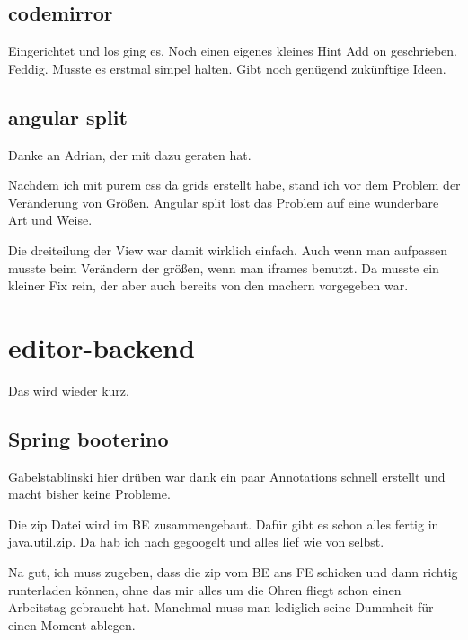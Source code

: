 \subsection{codemirror}\label{subsec:codemirror}
\todo
Eingerichtet und los ging es.
Noch einen eigenes kleines Hint Add on geschrieben.
Feddig.
Musste es erstmal simpel halten.
Gibt noch genügend zukünftige Ideen.

\subsection{angular split}\label{subsec:angular-split}
\todo
Danke an Adrian, der mit dazu geraten hat.

Nachdem ich mit purem css da grids erstellt habe, stand ich vor dem Problem der Veränderung von Größen.
Angular split löst das Problem auf eine wunderbare Art und Weise.

Die dreiteilung der View war damit wirklich einfach.
Auch wenn man aufpassen musste beim Verändern der größen, wenn man iframes benutzt.
Da musste ein kleiner Fix rein, der aber auch bereits von den machern vorgegeben war.

\section{editor-backend}\label{sec:editor-backend}
\todo
Das wird wieder kurz.

\subsection{Spring booterino}\label{subsec:spring-booterino}
\todo
Gabelstablinski hier drüben war dank ein paar Annotations schnell erstellt und macht bisher keine Probleme.

Die zip Datei wird im BE zusammengebaut.
Dafür gibt es schon alles fertig in java.util.zip.
Da hab ich nach gegoogelt und alles lief wie von selbst.

Na gut, ich muss zugeben, dass die zip vom BE ans FE schicken und dann richtig runterladen können,
ohne das mir alles um die Ohren fliegt schon einen Arbeitstag gebraucht hat.
Manchmal muss man lediglich seine Dummheit für einen Moment ablegen.